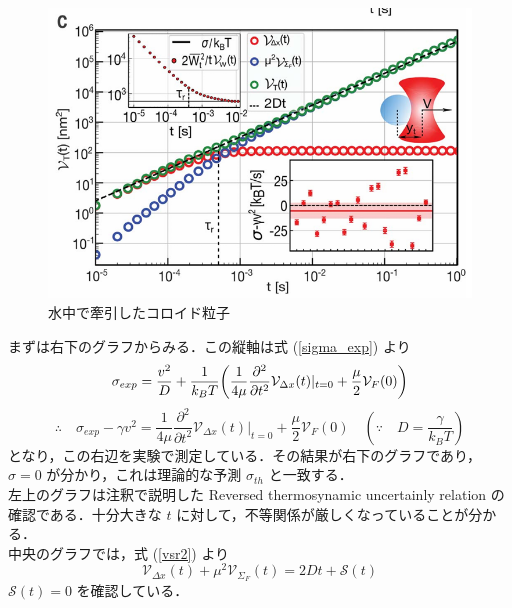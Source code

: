\documentclass{jsarticle}
\numberwithin{equation}{section}
\theoremstyle{definition}
\begin{document}
\begin{figure}[H]
  \begin{center}  
  \includegraphics[width=15cm]{vsr_fig1c.png}  
  \end{center}
  \caption{水中で牽引したコロイド粒子}
\end{figure}

まずは右下のグラフからみる．この縦軸は式 (\ref{sigma_exp}) より
\begin{equation}
  \sigma_{exp} = \frac{v^2}{D} + \frac{1}{k_B T} \qty( \frac{1}{4 \mu } \frac{\partial^2}{\partial t^2} \mathcal{V} _{\Delta x} (t)|_{t = 0} + \frac{\mu }{2} \mathcal{V}_F (0) )
\end{equation}
\begin{equation}
  \therefore \quad \sigma_{exp} - \gamma v^2 = \frac{1}{4 \mu } \frac{\partial^2}{\partial t^2} \mathcal{V} _{\Delta x} (t)|_{t = 0} + \frac{\mu }{2} \mathcal{V}_F (0) \quad (\because \quad D = \frac{\gamma }{k_B T})
\end{equation}
となり，この右辺を実験で測定している．その結果が右下のグラフであり，$\sigma = 0$ が分かり，これは理論的な予測 $\sigma_{th}$ と一致する．\\
\quad 左上のグラフは注釈で説明した Reversed thermosynamic uncertainly relation の確認である．十分大きな $t$ に対して，不等関係が厳しくなっていることが分かる．\\
\quad 中央のグラフでは，式 (\ref{vsr2}) より
\begin{equation}
  \mathcal{V} _{\Delta x} (t) + \mu^2 \mathcal{V} _{\Sigma_F} (t) = 2Dt + \mathcal{S} (t)
\end{equation}
$\mathcal{S} (t) = 0$ を確認している．
\end{document}
